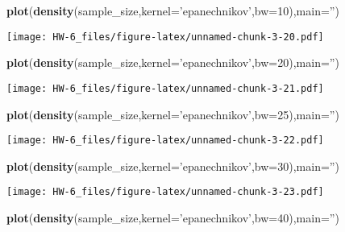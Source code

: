 \documentclass[]{article}
\newenvironment{Shaded}{\begin{snugshade}}{\end{snugshade}}
\newcommand{\DataTypeTok}[1]{\textcolor[rgb]{0.13,0.29,0.53}{#1}}
\newcommand{\DecValTok}[1]{\textcolor[rgb]{0.00,0.00,0.81}{#1}}
\newcommand{\KeywordTok}[1]{\textcolor[rgb]{0.13,0.29,0.53}{\textbf{#1}}}
\newcommand{\NormalTok}[1]{#1}
\newcommand{\StringTok}[1]{\textcolor[rgb]{0.31,0.60,0.02}{#1}}
\begin{document}
\begin{Shaded}
\begin{Highlighting}[]
\KeywordTok{plot}\NormalTok{(}\KeywordTok{density}\NormalTok{(sample_size,}\DataTypeTok{kernel=}\StringTok{'epanechnikov'}\NormalTok{,}\DataTypeTok{bw=}\DecValTok{10}\NormalTok{),}\DataTypeTok{main=}\StringTok{''}\NormalTok{)}
\end{Highlighting}
\end{Shaded}

\texttt{[image: HW-6\_files/figure-latex/unnamed-chunk-3-20.pdf]}

\begin{Shaded}
\begin{Highlighting}[]
\KeywordTok{plot}\NormalTok{(}\KeywordTok{density}\NormalTok{(sample_size,}\DataTypeTok{kernel=}\StringTok{'epanechnikov'}\NormalTok{,}\DataTypeTok{bw=}\DecValTok{20}\NormalTok{),}\DataTypeTok{main=}\StringTok{''}\NormalTok{)}
\end{Highlighting}
\end{Shaded}

\texttt{[image: HW-6\_files/figure-latex/unnamed-chunk-3-21.pdf]}

\begin{Shaded}
\begin{Highlighting}[]
\KeywordTok{plot}\NormalTok{(}\KeywordTok{density}\NormalTok{(sample_size,}\DataTypeTok{kernel=}\StringTok{'epanechnikov'}\NormalTok{,}\DataTypeTok{bw=}\DecValTok{25}\NormalTok{),}\DataTypeTok{main=}\StringTok{''}\NormalTok{)}
\end{Highlighting}
\end{Shaded}

\texttt{[image: HW-6\_files/figure-latex/unnamed-chunk-3-22.pdf]}

\begin{Shaded}
\begin{Highlighting}[]
\KeywordTok{plot}\NormalTok{(}\KeywordTok{density}\NormalTok{(sample_size,}\DataTypeTok{kernel=}\StringTok{'epanechnikov'}\NormalTok{,}\DataTypeTok{bw=}\DecValTok{30}\NormalTok{),}\DataTypeTok{main=}\StringTok{''}\NormalTok{)}
\end{Highlighting}
\end{Shaded}

\texttt{[image: HW-6\_files/figure-latex/unnamed-chunk-3-23.pdf]}

\begin{Shaded}
\begin{Highlighting}[]
\KeywordTok{plot}\NormalTok{(}\KeywordTok{density}\NormalTok{(sample_size,}\DataTypeTok{kernel=}\StringTok{'epanechnikov'}\NormalTok{,}\DataTypeTok{bw=}\DecValTok{40}\NormalTok{),}\DataTypeTok{main=}\StringTok{''}\NormalTok{)}
\end{Highlighting}
\end{Shaded}
\end{document}
